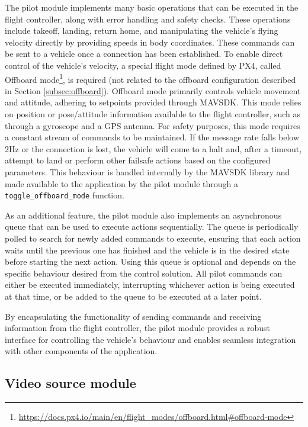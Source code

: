 The pilot module implements many basic operations that can be executed in the flight controller, along with error handling and safety checks. These operations include takeoff, landing, return home, and manipulating the vehicle's flying velocity directly by providing speeds in body coordinates. These commands can be sent to a vehicle once a connection has been established. 
To enable direct control of the vehicle's velocity, a special flight mode defined by PX4, called Offboard mode\footnote{\url{https://docs.px4.io/main/en/flight_modes/offboard.html\#offboard-mode}}, is required (not related to the offboard configuration described in Section \ref{subsec:offboard}). Offboard mode primarily controls vehicle movement and attitude, adhering to setpoints provided through MAVSDK. This mode relies on position or pose/attitude information available to the flight controller, such as through a gyroscope and a GPS antenna. 
For safety purposes, this mode requires a constant stream of commands to be maintained.
If the message rate falls below 2Hz or the connection is lost, the vehicle will come to a halt and, after a timeout, attempt to land or perform other failsafe actions based on the configured parameters.
This behaviour is handled internally by the MAVSDK library and made available to the application by the pilot module through a \texttt{toggle\_offboard\_mode} function.


As an additional feature, the pilot module also implements an asynchronous queue that can be used to execute actions sequentially. The queue is periodically polled to search for newly added commands to execute, ensuring that each action waits until the previous one has finished and the vehicle is in the desired state before starting the next action. Using this queue is optional and depends on the specific behaviour desired from the control solution. All pilot commands can either be executed immediately, interrupting whichever action is being executed at that time, or be added to the queue to be executed at a later point.


By encapsulating the functionality of sending commands and receiving information from the flight controller, the pilot module provides a robust interface for controlling the vehicle's behaviour and enables seamless integration with other components of the application.


\subsection{Video source module}
\label{subsec:viz-source-module}

